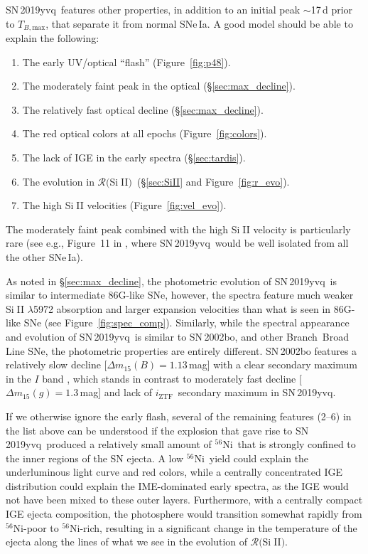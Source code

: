 \documentclass[twocolumn]{aastex63}
\def\ion#1#2{#1$\;${\footnotesize\rm{#2}}\relax}
\newcommand{\todo}[1]{{\color{magenta} to-do: {#1}}}
\newcommand{\iztf}{$i_\mathrm{ZTF}$}
\newcommand{\tbmax}{$T_{B,\mathrm{max}}$}
\newcommand{\RSiII}{$\mathcal{R}($\ion{Si}{II}$)$}
\newcommand{\radni}{$^{56}$Ni}
\newcommand{\sn}{SN\,2019yvq}
\begin{document}
\sn\ features other properties, in addition to an initial peak $\sim$17\,d
prior to \tbmax, that separate it from normal SNe\,Ia. A good model should be
able to explain the following:
%
\begin{enumerate}
    \item The early UV/optical ``flash'' (Figure~\ref{fig:p48}).
    \item The moderately faint peak in the optical (\S\ref{sec:max_decline}). 
    \item The relatively fast optical decline (\S\ref{sec:max_decline}). 
    \item The red optical colors at all epochs (Figure~\ref{fig:colors}). 
    \item The lack of IGE in the early spectra (\S\ref{sec:tardis}).
    \item The evolution in \RSiII\ (\S\ref{sec:SiII} and Figure~\ref{fig:r_evo}).
    \item The high \ion{Si}{II} velocities (Figure~\ref{fig:vel_evo}).
\end{enumerate}
%
The moderately faint peak combined with the high \ion{Si}{II} velocity is
particularly rare (see e.g., Figure~11 in \citealt{Polin19}, where \sn\ would
be well isolated from all the other SNe\,Ia).

As noted in \S\ref{sec:max_decline}, the photometric evolution of \sn\ is
similar to intermediate 86G-like SNe, however, the spectra feature much weaker
\ion{Si}{II} $\lambda$5972 absorption and larger expansion velocities than
what is seen in 86G-like SNe (see Figure~\ref{fig:spec_comp}). Similarly,
while the spectral appearance and evolution of \sn\ is similar to SN\,2002bo,
and other Branch~Broad Line SNe, the photometric properties are
entirely different. SN\,2002bo features a relatively slow decline
[$\Delta{m}_{15}(B) = 1.13$\,mag] with a clear secondary maximum in the $I$
band \citep{Benetti04}, which stands in contrast to moderately fast decline
[$\Delta{m}_{15}(g) = 1.3$\,mag] and lack of \iztf\ secondary maximum in \sn.

If we otherwise ignore the early flash, several of the remaining features
(2--6) in the list above can be understood if the explosion that gave rise to
\sn\ produced a relatively small amount of \radni\ that is strongly confined
to the inner regions of the SN ejecta. A low \radni\ yield could explain the
underluminous light curve and red colors, while a centrally concentrated IGE
distribution could explain the IME-dominated early spectra, as the IGE would
not have been mixed to these outer layers. Furthermore, with a centrally
compact IGE ejecta composition, the photosphere would transition somewhat
rapidly from \radni-poor to \radni-rich, resulting in a significant change in
the temperature of the ejecta along the lines of what we see in the evolution
of \RSiII.
\end{document}

